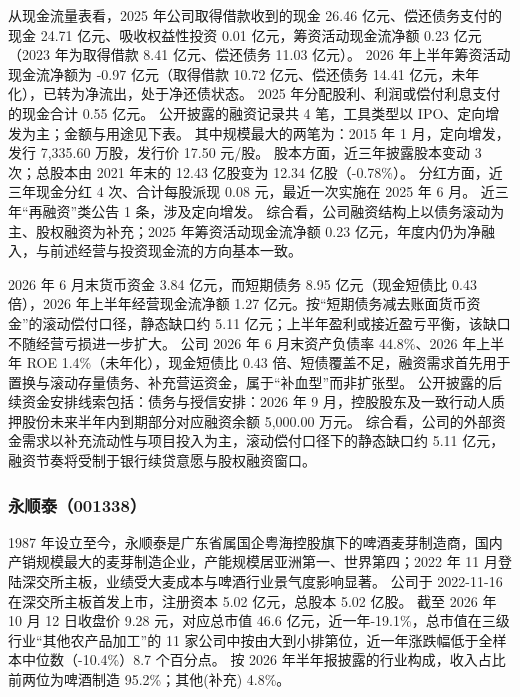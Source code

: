 从现金流量表看，2025 年公司取得借款收到的现金 26.46 亿元、偿还债务支付的现金 24.71 亿元、吸收权益性投资 0.01 亿元，筹资活动现金流净额 0.23 亿元（2023 年为取得借款 8.41 亿元、偿还债务 11.03 亿元）。 2026 年上半年筹资活动现金流净额为 -0.97 亿元（取得借款 10.72 亿元、偿还债务 14.41 亿元，未年化），已转为净流出，处于净还债状态。 2025 年分配股利、利润或偿付利息支付的现金合计 0.55 亿元。 公开披露的融资记录共 4 笔，工具类型以 IPO、定向增发为主；金额与用途见下表。 其中规模最大的两笔为：2015 年 1 月，定向增发，发行 7,335.60 万股，发行价 17.50 元/股。 股本方面，近三年披露股本变动 3 次；总股本由 2021 年末的 12.43 亿股变为 12.34 亿股（-0.78\%）。 分红方面，近三年现金分红 4 次、合计每股派现 0.08 元，最近一次实施在 2025 年 6 月。 近三年“再融资”类公告 1 条，涉及定向增发。 综合看，公司融资结构上以债务滚动为主、股权融资为补充；2025 年筹资活动现金流净额 0.23 亿元，年度内仍为净融入，与前述经营与投资现金流的方向基本一致。

 2026 年 6 月末货币资金 3.84 亿元，而短期债务 8.95 亿元（现金短债比 0.43 倍），2026 年上半年经营现金流净额 1.27 亿元。按“短期债务减去账面货币资金”的滚动偿付口径，静态缺口约 5.11 亿元；上半年盈利或接近盈亏平衡，该缺口不随经营亏损进一步扩大。 公司 2026 年 6 月末资产负债率 44.8\%、2026 年上半年 ROE 1.4\%（未年化），现金短债比 0.43 倍、短债覆盖不足，融资需求首先用于置换与滚动存量债务、补充营运资金，属于“补血型”而非扩张型。 公开披露的后续资金安排线索包括：债务与授信安排：2026 年 9 月，控股股东及一致行动人质押股份未来半年内到期部分对应融资余额 5,000.00 万元。 综合看，公司的外部资金需求以补充流动性与项目投入为主，滚动偿付口径下的静态缺口约 5.11 亿元，融资节奏将受制于银行续贷意愿与股权融资窗口。




\subsubsection{永顺泰（001338）}
\label{co:001338}

 1987 年设立至今，永顺泰是广东省属国企粤海控股旗下的啤酒麦芽制造商，国内产销规模最大的麦芽制造企业，产能规模居亚洲第一、世界第四；2022 年 11 月登陆深交所主板，业绩受大麦成本与啤酒行业景气度影响显著。 公司于 2022-11-16 在深交所主板首发上市，注册资本 5.02 亿元，总股本 5.02 亿股。 截至 2026 年 10 月 12 日收盘价 9.28 元，对应总市值 46.6 亿元，近一年-19.1\%，总市值在三级行业“其他农产品加工”的 11 家公司中按由大到小排第位，近一年涨跌幅低于全样本中位数（-10.4\%）8.7 个百分点。 按 2026 年半年报披露的行业构成，收入占比前两位为啤酒制造 95.2\%；其他(补充) 4.8\%。


